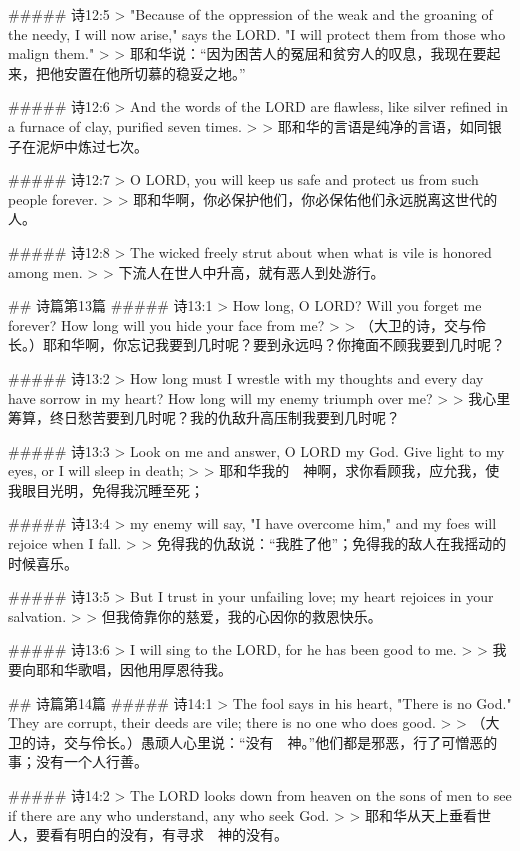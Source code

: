 ##### 诗12:5
> "Because of the oppression of the weak and the groaning of the needy, I will now arise," says the LORD. "I will protect them from those who malign them."
>
> 耶和华说：“因为困苦人的冤屈和贫穷人的叹息，我现在要起来，把他安置在他所切慕的稳妥之地。”


##### 诗12:6
> And the words of the LORD are flawless, like silver refined in a furnace of clay, purified seven times.
>
> 耶和华的言语是纯净的言语，如同银子在泥炉中炼过七次。


##### 诗12:7
> O LORD, you will keep us safe and protect us from such people forever.
>
> 耶和华啊，你必保护他们，你必保佑他们永远脱离这世代的人。


##### 诗12:8
> The wicked freely strut about when what is vile is honored among men.
>
> 下流人在世人中升高，就有恶人到处游行。


## 诗篇第13篇
##### 诗13:1
> How long, O LORD? Will you forget me forever? How long will you hide your face from me?
>
> （大卫的诗，交与伶长。）耶和华啊，你忘记我要到几时呢？要到永远吗？你掩面不顾我要到几时呢？


##### 诗13:2
> How long must I wrestle with my thoughts and every day have sorrow in my heart? How long will my enemy triumph over me?
>
> 我心里筹算，终日愁苦要到几时呢？我的仇敌升高压制我要到几时呢？


##### 诗13:3
> Look on me and answer, O LORD my God. Give light to my eyes, or I will sleep in death;
>
> 耶和华我的　神啊，求你看顾我，应允我，使我眼目光明，免得我沉睡至死；


##### 诗13:4
> my enemy will say, "I have overcome him," and my foes will rejoice when I fall.
>
> 免得我的仇敌说：“我胜了他”；免得我的敌人在我摇动的时候喜乐。


##### 诗13:5
> But I trust in your unfailing love; my heart rejoices in your salvation.
>
> 但我倚靠你的慈爱，我的心因你的救恩快乐。


##### 诗13:6
> I will sing to the LORD, for he has been good to me.
>
> 我要向耶和华歌唱，因他用厚恩待我。


## 诗篇第14篇
##### 诗14:1
> The fool says in his heart, "There is no God." They are corrupt, their deeds are vile; there is no one who does good.
>
> （大卫的诗，交与伶长。）愚顽人心里说：“没有　神。”他们都是邪恶，行了可憎恶的事；没有一个人行善。


##### 诗14:2
> The LORD looks down from heaven on the sons of men to see if there are any who understand, any who seek God.
>
> 耶和华从天上垂看世人，要看有明白的没有，有寻求　神的没有。


